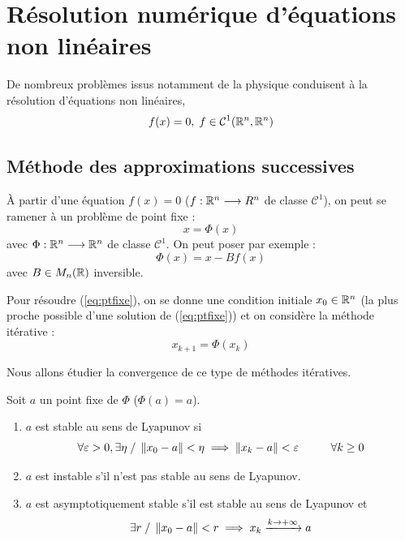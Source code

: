 \chapter{Résolution numérique d'équations non linéaires}

De nombreux problèmes issus notamment de la physique conduisent à la résolution d'équations non linéaires,
\[
    f(x)=0, \; f \in \mathcal{C}^1(\mathbb{R}^n,\mathbb{R}^n)
\]

\section{Méthode des approximations successives}

À partir d'une équation $f(x) = 0$ ($f : \mathbb{R}^n \longrightarrow R^n$ de classe $\mathcal{C}^1$),
on peut se ramener à un problème de point fixe :
\begin{equation}
    x = \Phi(x)
    \label{eq:ptfixe}
\end{equation}
avec $\Phi : \mathbb{R}^n \longrightarrow \mathbb{R}^n$ de classe $\mathcal{C}^1$. On peut poser par exemple :
\begin{equation*}
    \Phi(x) = x - B f(x)
\end{equation*}
avec $B \in M_n(\mathbb{R})$ inversible.

Pour résoudre (\ref{eq:ptfixe}), on se donne une condition initiale $x_0 \in \mathbb{R}^n$ (la plus proche possible d'une solution de (\ref{eq:ptfixe})) et on considère la méthode itérative :
\begin{equation}
    x_{k+1} = \Phi(x_k)
    \label{eq:methodeiterative}
\end{equation}

Nous allons étudier la convergence de ce type de méthodes itératives.

\begin{fdef}
    Soit $a$ un point fixe de $\Phi$ ($\Phi(a) = a$).
    \begin{enumerate}[label=\roman*)]
        \item $a$ est stable au sens de Lyapunov si
            \[
                \forall \varepsilon > 0, \exists \eta \; / \; \left\lVert x_0 - a\right\rVert < \eta \implies \left\lVert x_k - a\right\rVert < \varepsilon \hspace{1cm} \forall k \geq 0
            \]

        \item $a$ est instable s'il n'est pas stable au sens de Lyapunov.

        \item $a$ est asymptotiquement stable s'il est stable au sens de Lyapunov et
            \[
                \exists r \; / \; \left\lVert x_0 - a\right\rVert < r \implies x_k \xrightarrow{k \to +\infty} a
            \]
    \end{enumerate}
\end{fdef}

